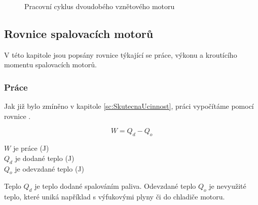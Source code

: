 \begin{figure}[H]
    
    \caption{Pracovní cyklus dvoudobého vznětového motoru \jaDiag}
    \label{obr:PracovniCyklusDvoudobehoVznetovehoMotoru}
\end{figure}

\newpage

\subsection{Rovnice spalovacích motorů}
{V této kapitole jsou popsány rovnice týkající se práce, výkonu a kroutícího momentu spalovacích motorů.}

\subsubsection{Práce}
{Jak již bylo zmíněno v kapitole \ref{sc:SkutecnaUcinnost}, práci vypočítáme pomocí rovnice .}
\cite{NCEPU:ThermalEfficiencyForHeatEngines}

\begin{equation}\label{rv:prace2}
    W=Q_d-Q_o
\end{equation}

{\(W\) je práce (J)}\\
{\(Q_d\) je dodané teplo (J)}\\
{\(Q_o\) je odevzdané teplo (J)}\\
\podst

{Teplo \(Q_d\) je teplo dodané spalováním paliva. Odevzdané teplo \(Q_o\) je nevyužité teplo, které uniká například s výfukovými plyny či do chladiče motoru.}

